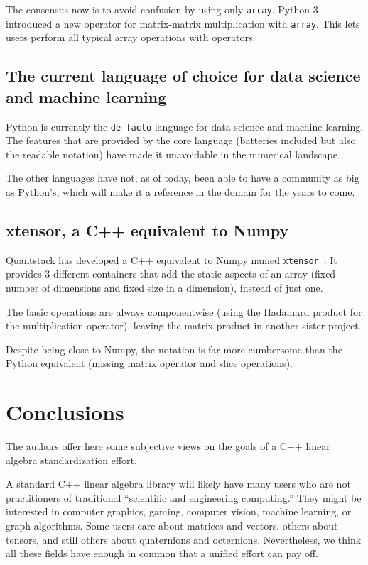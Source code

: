 The consensus now is to avoid confusion by using only \texttt{array}.
Python 3 introduced a new operator for matrix-matrix multiplication
with \texttt{array}.  This lets users perform all typical array
operations with operators.

\subsection{The current language of choice for data science and machine learning}
\label{S:Python:currentlanguage}

Python is currently the \texttt{de facto} language for data science and
 machine learning. The features that are provided by the core language
 (batteries included but also the readable notation) have made it
 unavoidable in the numerical landscape.

 The other languages have not, as of today, been able to have
  a community as big as Python's, which will make it a reference in the
  domain for the years to come.

\subsection{xtensor, a C++ equivalent to Numpy}
\label{S:Python:xtensor}

Quantstack has developed a C++ equivalent to Numpy named
\texttt{xtensor}~\cite{xtensor}. It provides 3 different containers
that add the static aspects of an array (fixed number of dimensions
and fixed size in a dimension), instead of just one.

The basic operations are always componentwise (using the Hadamard
product for the multiplication operator), leaving the matrix product
in another sister project.

Despite being close to Numpy, the notation is far more cumbersome than
the Python equivalent (missing matrix operator and slice operations).

\section{Conclusions}
\label{S:conclusions}

The authors offer here some subjective views on the goals of a C++
linear algebra standardization effort.

A standard C++ linear algebra library will likely have many users who
are not practitioners of traditional ``scientific and engineering
computing.''  They might be interested in computer graphics, gaming,
computer vision, machine learning, or graph algorithms.  Some users
care about matrices and vectors, others about tensors, and still
others about quaternions and octernions.  Nevertheless, we think all
these fields have enough in common that a unified effort can pay off.

